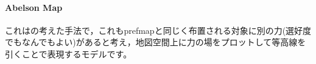 \documentclass{ltjsbook}
\begin{document}

\paragraph{Abelson Map}これは\citep{abelson1954technique}の考えた手法で，これもprefmapと同じく布置される対象に別の力(選好度でもなんでもよい)があると考え，地図空間上に力の場をプロットして等高線を引くことで表現するモデルです。
\end{document}
